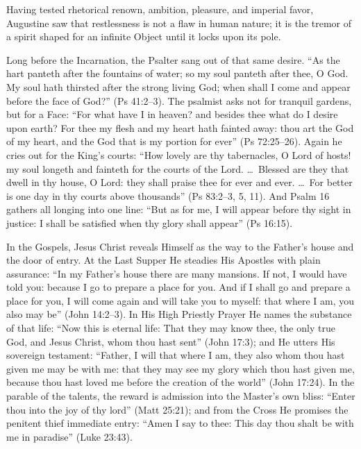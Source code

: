 Having tested rhetorical renown, ambition, pleasure, and imperial favor, Augustine saw that restlessness is not a flaw in human nature; it is the tremor of a spirit shaped for an infinite Object until it locks upon its pole.

Long before the Incarnation, the Psalter sang out of that same desire. ``As the hart panteth after the fountains of water; so my soul panteth after thee, O God. My soul hath thirsted after the strong living God; when shall I come and appear before the face of God?'' (Ps 41:2--3). The psalmist asks not for tranquil gardens, but for a Face: ``For what have I in heaven? and besides thee what do I desire upon earth? For thee my flesh and my heart hath fainted away: thou art the God of my heart, and the God that is my portion for ever'' (Ps 72:25--26). Again he cries out for the King's courts: ``How lovely are thy tabernacles, O Lord of hosts! my soul longeth and fainteth for the courts of the Lord. \dots\ Blessed are they that dwell in thy house, O Lord: they shall praise thee for ever and ever. \dots\ For better is one day in thy courts above thousands'' (Ps 83:2--3, 5, 11). And Psalm 16 gathers all longing into one line: ``But as for me, I will appear before thy sight in justice: I shall be satisfied when thy glory shall appear'' (Ps 16:15).

In the Gospels, Jesus Christ reveals Himself as the way to the Father's house and the door of entry. At the Last Supper He steadies His Apostles with plain assurance: ``In my Father's house there are many mansions. If not, I would have told you: because I go to prepare a place for you. And if I shall go and prepare a place for you, I will come again and will take you to myself: that where I am, you also may be'' (John 14:2--3). In His High Priestly Prayer He names the substance of that life: ``Now this is eternal life: That they may know thee, the only true God, and Jesus Christ, whom thou hast sent'' (John 17:3); and He utters His sovereign testament: ``Father, I will that where I am, they also whom thou hast given me may be with me: that they may see my glory which thou hast given me, because thou hast loved me before the creation of the world'' (John 17:24). In the parable of the talents, the reward is admission into the Master's own bliss: ``Enter thou into the joy of thy lord'' (Matt 25:21); and from the Cross He promises the penitent thief immediate entry: ``Amen I say to thee: This day thou shalt be with me in paradise'' (Luke 23:43).

